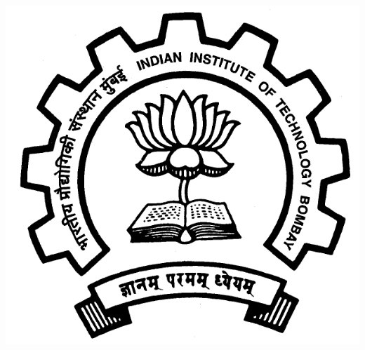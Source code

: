 \begin{titlepage}




\includegraphics[scale = 0.20]{iitblogo.png} %
 

\vfill %

\end{titlepage}
\tableofcontents
\newpage
\listoffigures
\newpage
\listoftables

